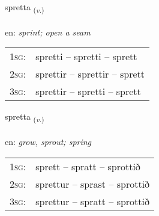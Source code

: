 \documentclass[frontgrid, backgrid]{flacards}\usepackage[]{graphicx}\usepackage[]{xcolor}
\begin{document}
\renewcommand{\flhead}{\vskip5pt \fboxsep=0pt {\small\bfseries\footnotesize Sagnorð | Verb}}
\renewcommand{\fcfoot}{\vskip5pt \fboxsep=0pt \hspace{2pt}{\small\bfseries\footnotesize 3K}}

\renewcommand{\blhead}{\vskip5pt {\small\bfseries\footnotesize Sagnorð | Verb }}
\renewcommand{\bcfoot}{\vskip5pt \hspace{2pt}{\small\bfseries\footnotesize 3K}}


{spretta \small{\textsubscript{(\textit{v.})}} \\[1ex] %
\textphonetic{[sprɛhta]} \\
en: \emph{sprint; open a seam} \\  [2ex]
\renewcommand*{\arraystretch}{0.8}
\begin{tabular}{p{1cm}l}
\textsc{1sg}: & spretti -- spretti -- sprett \\ 
\textsc{2sg}: & sprettir -- sprettir -- sprett \\ 
\textsc{3sg}: & sprettir -- spretti -- sprett \\ 
\end{tabular}
}

\renewcommand{\flhead}{\vskip5pt \fboxsep=0pt {\small\bfseries\footnotesize Sagnorð | Verb}}
\renewcommand{\fcfoot}{\vskip5pt \fboxsep=0pt \hspace{2pt}{\small\bfseries\footnotesize 3K}}

\renewcommand{\blhead}{\vskip5pt {\small\bfseries\footnotesize Sagnorð | Verb }}
\renewcommand{\bcfoot}{\vskip5pt \hspace{2pt}{\small\bfseries\footnotesize 3K}}


{spretta \small{\textsubscript{(\textit{v.})}} \\[1ex] %
\textphonetic{[sprɛhta]} \\
en: \emph{grow, sprout; spring} \\  [2ex]
\renewcommand*{\arraystretch}{0.8}
\begin{tabular}{p{1cm}l}
\textsc{1sg}: & sprett -- spratt -- sprottið \\ 
\textsc{2sg}: & sprettur -- sprast -- sprottið \\ 
\textsc{3sg}: & sprettur -- spratt -- sprottið \\ 
\end{tabular}
}
\end{document}
